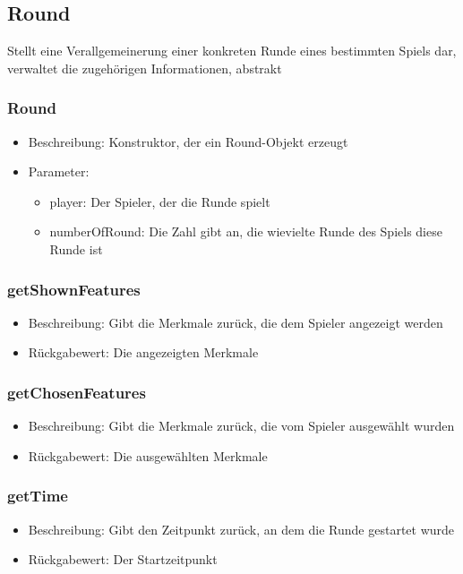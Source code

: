 \documentclass[a4paper]{scrreprt}
\begin{document}
	\subsection{Round}
	Stellt eine Verallgemeinerung einer konkreten Runde eines bestimmten Spiels dar, verwaltet die zugehörigen Informationen, abstrakt
	\subsubsection{Round}
	\begin{itemize}
		\item Beschreibung: Konstruktor, der ein Round-Objekt erzeugt
		\item Parameter:
		\begin{itemize}
			\item player: Der Spieler, der die Runde spielt
			\item numberOfRound: Die Zahl gibt an, die wievielte Runde des Spiels diese Runde ist
		\end{itemize}
	\end{itemize}
	\subsubsection{getShownFeatures}
	\begin{itemize}
		\item Beschreibung: Gibt die Merkmale zurück, die dem Spieler angezeigt werden
		\item Rückgabewert: Die angezeigten Merkmale
	\end{itemize}
	\subsubsection{getChosenFeatures}
	\begin{itemize}
		\item Beschreibung: Gibt die Merkmale zurück, die vom Spieler ausgewählt wurden
		\item Rückgabewert: Die ausgewählten Merkmale
	\end{itemize}
	\subsubsection{getTime}
	\begin{itemize}
		\item Beschreibung: Gibt den Zeitpunkt zurück, an dem die Runde gestartet wurde
		\item Rückgabewert: Der Startzeitpunkt
	\end{itemize}
\end{document}
